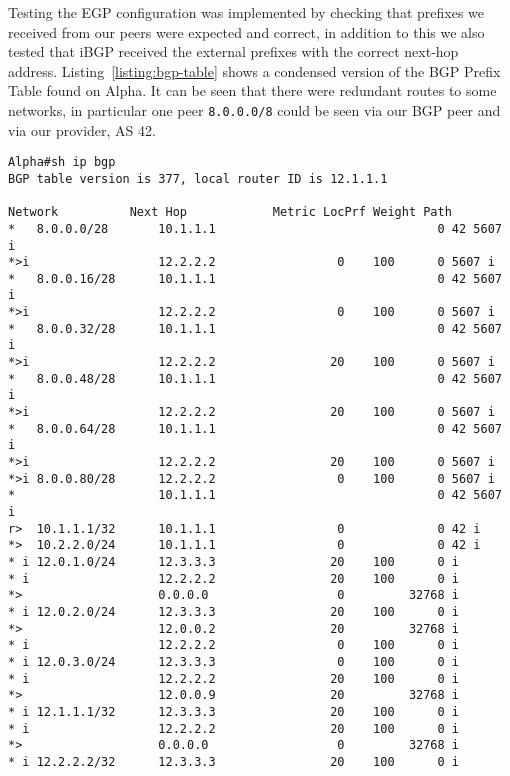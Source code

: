 Testing the EGP configuration was implemented by checking that prefixes we
received from our peers were expected and correct, in addition to this we also
tested that iBGP received the external prefixes with the correct next-hop
address. Listing~\ref{listing:bgp-table} shows a condensed version of the BGP
Prefix Table found on Alpha. It can be seen that there were redundant routes to
some networks, in particular one peer \texttt{8.0.0.0/8} could be seen via our
BGP peer and via our provider, AS 42.

\begin{lstlisting}[caption={Extract of Alpha BGP Table}, label={listing:bgp-table}]
Alpha#sh ip bgp
BGP table version is 377, local router ID is 12.1.1.1

Network          Next Hop            Metric LocPrf Weight Path
*   8.0.0.0/28       10.1.1.1                               0 42 5607 i
*>i                  12.2.2.2                 0    100      0 5607 i
*   8.0.0.16/28      10.1.1.1                               0 42 5607 i
*>i                  12.2.2.2                 0    100      0 5607 i
*   8.0.0.32/28      10.1.1.1                               0 42 5607 i
*>i                  12.2.2.2                20    100      0 5607 i
*   8.0.0.48/28      10.1.1.1                               0 42 5607 i
*>i                  12.2.2.2                20    100      0 5607 i
*   8.0.0.64/28      10.1.1.1                               0 42 5607 i
*>i                  12.2.2.2                20    100      0 5607 i
*>i 8.0.0.80/28      12.2.2.2                 0    100      0 5607 i
*                    10.1.1.1                               0 42 5607 i
r>  10.1.1.1/32      10.1.1.1                 0             0 42 i
*>  10.2.2.0/24      10.1.1.1                 0             0 42 i
* i 12.0.1.0/24      12.3.3.3                20    100      0 i
* i                  12.2.2.2                20    100      0 i
*>                   0.0.0.0                  0         32768 i
* i 12.0.2.0/24      12.3.3.3                20    100      0 i
*>                   12.0.0.2                20         32768 i
* i                  12.2.2.2                 0    100      0 i
* i 12.0.3.0/24      12.3.3.3                 0    100      0 i
* i                  12.2.2.2                20    100      0 i
*>                   12.0.0.9                20         32768 i
* i 12.1.1.1/32      12.3.3.3                20    100      0 i
* i                  12.2.2.2                20    100      0 i
*>                   0.0.0.0                  0         32768 i
* i 12.2.2.2/32      12.3.3.3                20    100      0 i

\end{lstlisting}
